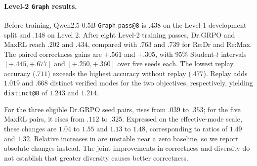 \begin{table}[!htbp]
  \centering
  \caption{\textbf{A stronger fresh objective need not increase the additional benefit of replay.}
  Contrasts use five common seeds per domain across all four methods.
  The interaction is
  $(\mathrm{Re:Max}-\mathrm{MaxRL})-(\mathrm{Re:Dr}-\mathrm{Dr.GRPO})$.
  Here $P_8=\texttt{pass@8}$, $D_8=\texttt{distinct@8}$, and $B_8=D_8-P_8$.
  Entries report paired means and nominal 95\% Student-$t$ intervals. Both
  mode-count metrics depend on correctness. The conditional-diversity analysis
  in Fig.~\ref{fig:replay-level2-effects} applies separate eligibility
  requirements, so its seed populations can differ from those in this table.}

\label{tab:level2-factorial-contrasts}
  \scriptsize
  \setlength{\tabcolsep}{3pt}
\end{table}


\paragraph{Level-2 \texttt{Graph} results.}
\label{app:levels-numerical-detail}
Before training, Qwen2.5-0.5B \texttt{Graph} \texttt{pass@8} is $.438$
on the Level-1 development split and $.148$ on Level 2. After eight Level-2
training passes, Dr.GRPO and MaxRL reach $.202$ and $.434$, compared
with $.763$ and $.739$ for Re:Dr and Re:Max. The paired correctness gains
are $+.561$ and $+.305$, with 95\% Student-$t$ intervals $[+.445,+.677]$
and $[+.250,+.360]$ over five seeds each. The lowest replay accuracy
($.711$) exceeds the highest accuracy without replay ($.477$). Replay adds
$1.019$ and $.668$ distinct verified modes for the two objectives,
respectively, yielding \texttt{distinct@8} of $1.243$ and $1.214$.

For the three eligible Dr.GRPO seed pairs, \pmd{} rises from $.039$ to
$.353$; for the five MaxRL pairs, it rises from $.112$ to $.325$.
Expressed on the effective-mode scale, these changes are $1.04$ to $1.55$
and $1.13$ to $1.48$, corresponding to ratios of $1.49$ and $1.32$.
Relative increases in \pmd{} are unstable near a zero baseline, so we
report absolute changes instead. The joint improvements in correctness and
diversity do not establish that greater diversity causes better correctness.

